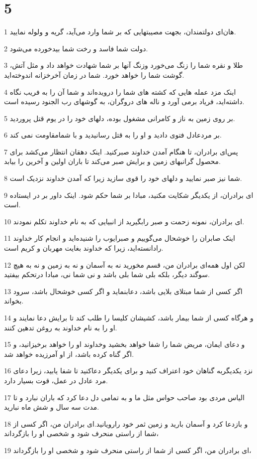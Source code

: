 \chapter{5}

\par 1 هان‌ای دولتمندان، بجهت مصیبتهایی که بر شما وارد می‌آید، گریه و ولوله نمایید.
\par 2 دولت شما فاسد و رخت شما بیدخورده می‌شود.
\par 3 طلا و نقره شما را زنگ می‌خورد وزنگ آنها بر شما شهادت خواهد داد و مثل آتش، گوشت شما را خواهد خورد. شما در زمان آخرخزانه اندوخته‌اید.
\par 4 اینک مزد عمله هایی که کشته های شما را درویده‌اند و شما آن را به فریب نگاه داشته‌اید، فریاد برمی آورد و ناله های دروگران، به گوشهای رب الجنود رسیده است.
\par 5 بر روی زمین به ناز و کامرانی مشغول بوده، دلهای خود را در یوم قتل پروردید.
\par 6 بر مردعادل فتوی دادید و او را به قتل رسانیدید و با شمامقاومت نمی کند.
\par 7 پس‌ای برادران، تا هنگام آمدن خداوند صبرکنید. اینک دهقان انتظار می‌کشد برای محصول گرانبهای زمین و برایش صبر می‌کند تا باران اولین و آخرین را بیابد.
\par 8 شما نیز صبر نمایید و دلهای خود را قوی سازید زیرا که آمدن خداوند نزدیک است.
\par 9 ‌ای برادران، از یکدیگر شکایت مکنید، مبادا بر شما حکم شود. اینک داور بر در ایستاده است.
\par 10 ‌ای برادران، نمونه زحمت و صبر رابگیرید از انبیایی که به نام خداوند تکلم نمودند.
\par 11 اینک صابران را خوشحال می‌گوییم و صبرایوب را شنیده‌اید و انجام کار خداوند رادانسته‌اید، زیرا که خداوند بغایت مهربان و کریم است.
\par 12 لکن اول همه‌ای برادران من، قسم مخورید نه به آسمان و نه به زمین و نه به هیچ سوگند دیگر، بلکه بلی شما بلی باشد و نی شما نی، مبادا درتحکم بیفتید.
\par 13 اگر کسی از شما مبتلای بلایی باشد، دعابنماید و اگر کسی خوشحال باشد، سرود بخواند.
\par 14 و هرگاه کسی از شما بیمار باشد، کشیشان کلیسا را طلب کند تا برایش دعا نمایند و او را به نام خداوند به روغن تدهین کنند.
\par 15 و دعای ایمان، مریض شما را شفا خواهد بخشید وخداوند او را خواهد برخیزانید، و اگر گناه کرده باشد، از او آمرزیده خواهد شد.
\par 16 نزد یکدیگربه گناهان خود اعتراف کنید و برای یکدیگر دعاکنید تا شفا یابید، زیرا دعای مرد عادل در عمل، قوت بسیار دارد.
\par 17 الیاس مردی بود صاحب حواس مثل ما و به تمامی دل دعا کرد که باران نبارد و تا مدت سه سال و شش ماه نبارید.
\par 18 و بازدعا کرد و آسمان بارید و زمین ثمر خود رارویانید.‌ای برادران من، اگر کسی از شما از راستی منحرف شود و شخصی او را بازگرداند،
\par 19 ‌ای برادران من، اگر کسی از شما از راستی منحرف شود و شخصی او را بازگرداند،



